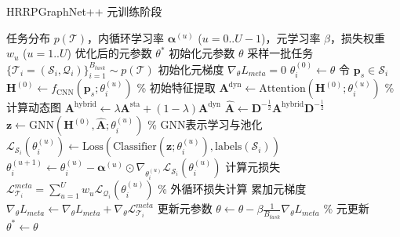 \begin{algorithm}[htbp]
\caption{HRRPGraphNet++ 元训练阶段}
\label{alg:meta_training}
\begin{algorithmic}[1]
    \REQUIRE 任务分布 $p(\mathcal{T})$，内循环学习率 $\boldsymbol{\alpha}^{(u)}$ ($u=0..U-1$)，元学习率 $\beta$，损失权重 $w_u$ ($u=1..U$)
    \ENSURE 优化后的元参数 $\theta^*$
    \STATE 初始化元参数 $\theta$
        \STATE 采样一批任务 $\{\mathcal{T}_i = (\mathcal{S}_i, \mathcal{Q}_i)\}_{i=1}^{B_{task}} \sim p(\mathcal{T})$
        \STATE 初始化元梯度 $\nabla_\theta L_{meta} = 0$
            \STATE $\theta_i^{(0)} \leftarrow \theta$
                \STATE 令 $\mathbf{p}_s \in \mathcal{S}_i$
                \STATE $\mathbf{H}^{(0)} \leftarrow f_{\text{CNN}}(\mathbf{p}_s; \theta_i^{(u)})$ \% 初始特征提取
                \STATE $\mathbf{A}^{\text{dyn}} \leftarrow \text{Attention}(\mathbf{H}^{(0)}; \theta_i^{(u)})$ \% 计算动态图
                \STATE $\mathbf{A}^{\text{hybrid}} \leftarrow \lambda \mathbf{A}^{\text{sta}} + (1-\lambda) \mathbf{A}^{\text{dyn}}$
                \STATE $\hat{\mathbf{A}} \leftarrow \mathbf{D}^{-\frac{1}{2}} \mathbf{A}^{\text{hybrid}} \mathbf{D}^{-\frac{1}{2}}$
                \STATE $\mathbf{z} \leftarrow \text{GNN}(\mathbf{H}^{(0)}, \hat{\mathbf{A}}; \theta_i^{(u)})$ \% GNN表示学习与池化
                \STATE $\mathcal{L}_{\mathcal{S}_i}(\theta_i^{(u)}) \leftarrow \text{Loss}( \text{Classifier}(\mathbf{z}; \theta_i^{(u)}), \text{labels}(\mathcal{S}_i) )$
                \STATE $\theta_i^{(u+1)} \leftarrow \theta_i^{(u)} - \boldsymbol{\alpha}^{(u)} \odot \nabla_{\theta_i^{(u)}} \mathcal{L}_{\mathcal{S}_i}(\theta_i^{(u)})$
            \ENDFOR
            \STATE 计算元损失 $\mathcal{L}_{\mathcal{T}_i}^{meta} = \sum_{u=1}^{U} w_u \mathcal{L}_{\mathcal{Q}_i}(\theta_i^{(u)})$ \% 外循环损失计算
            \STATE 累加元梯度 $\nabla_\theta L_{meta} \leftarrow \nabla_\theta L_{meta} + \nabla_\theta \mathcal{L}_{\mathcal{T}_i}^{meta}$
        \ENDFOR
        \STATE 更新元参数 $\theta \leftarrow \theta - \beta \frac{1}{B_{task}} \nabla_\theta L_{meta}$ \% 元更新
    \ENDWHILE
    \STATE $\theta^* \leftarrow \theta$
\end{algorithmic}
\end{algorithm}

